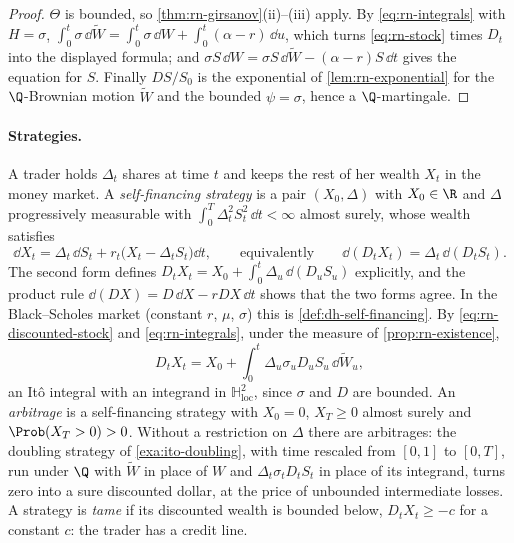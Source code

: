 \begin{proof}
$\Theta$ is bounded, so \cref{thm:rn-girsanov}(ii)--(iii) apply. By \eqref{eq:rn-integrals}
with $H=\sigma$, $\int_0^t\sigma\,\dd\widetilde W=\int_0^t\sigma\,\dd W+\int_0^t(\alpha-r)\,\dd u$,
which turns \eqref{eq:rn-stock} times $D_t$ into the displayed formula; and
$\sigma S\,\dd W=\sigma S\,\dd\widetilde W-(\alpha-r)S\,\dd t$ gives the equation for $S$. Finally $D S/S_0$ is the
exponential of \cref{lem:rn-exponential} for the $\Q$-Brownian motion $\widetilde W$ and the
bounded $\psi=\sigma$, hence a $\Q$-martingale.
\end{proof}

\paragraph{Strategies.} A trader holds $\Delta_t$ shares at time $t$ and keeps the rest of her
wealth $X_t$ in the money market. A \emph{self-financing strategy} is a pair $(X_0,\Delta)$
with $X_0\in\R$ and $\Delta$ progressively measurable with $\int_0^T\Delta_t^2S_t^2\,\dd
t<\infty$ almost surely, whose wealth satisfies
\begin{equation}\label{eq:rn-wealth}
  \dd X_t=\Delta_t\,\dd S_t+r_t\big(X_t-\Delta_tS_t\big)\dd t,
  \qquad\text{equivalently}\qquad
  \dd(D_tX_t)=\Delta_t\,\dd(D_tS_t).
\end{equation}
The second form defines $D_tX_t=X_0+\int_0^t\Delta_u\,\dd(D_uS_u)$ explicitly, and the product
rule $\dd(DX)=D\,\dd X-rDX\,\dd t$ shows that the two forms agree. In the Black--Scholes
market (constant $r$, $\mu$, $\sigma$) this is \cref{def:dh-self-financing}. By \eqref{eq:rn-discounted-stock} and \eqref{eq:rn-integrals},
under the measure of \cref{prop:rn-existence},
\begin{equation}\label{eq:rn-wealth-q}
  D_tX_t=X_0+\int_0^t\Delta_u\sigma_uD_uS_u\,\dd\widetilde W_u ,
\end{equation}
an It\^o integral with an integrand in $\mathbb H^2_{\mathrm{loc}}$, since $\sigma$ and $D$
are bounded. An \emph{arbitrage} is a self-financing strategy with $X_0=0$, $X_T\ge0$
almost surely and $\Prob(X_T>0)>0$. Without a restriction on $\Delta$ there are arbitrages:
the doubling strategy of \cref{exa:ito-doubling}, with time rescaled from $[0,1]$ to $[0,T]$,
run under $\Q$ with $\widetilde W$ in place of $W$ and $\Delta_t\sigma_tD_tS_t$ in place of its
integrand, turns zero into a sure discounted dollar, at the price of unbounded intermediate losses. A strategy is
\emph{tame} if its discounted wealth is bounded below, $D_tX_t\ge-c$ for a constant $c$: the
trader has a credit line.

